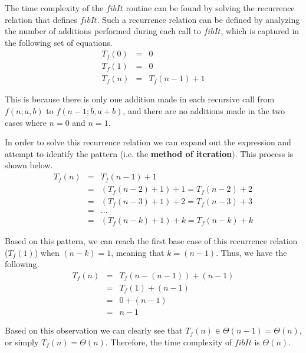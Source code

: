 \documentclass[11pt]{article}
\begin{document}
\begin{prob}{2}
\end{prob}
\begin{sol}

The time complexity of the $fibIt$ routine can be found by solving the recurrence relation that defines $fibIt$. Such a recurrence relation can be defined by analyzing the number of additions performed during each call to $fibIt$, which is captured in the following set of equations.
\begin{eqnarray*}
T_{f}(0) & = & 0 \\
T_{f}(1) & = & 0 \\
T_{f}(n) & = & T_{f}(n-1) + 1
\end{eqnarray*}

This is because there is only one addition made in each recursive call from $f(n;a,b)$ to $f(n-1;b,a+b)$, and there are no additions made in the two cases where $n = 0$ and $n = 1$.

In order to solve this recurrence relation we can expand out the expression and attempt to identify the pattern (i.e. the \textbf{method of iteration}). This process is shown below.
\begin{eqnarray*}
T_{f}(n) & = & T_{f}(n - 1) + 1 \\
& = & (T_{f}(n - 2) + 1) + 1 = T_{f}(n - 2) + 2 \\
& = & (T_{f}(n - 3) + 1) + 2 = T_{f}(n - 3) + 3 \\
& = & ... \\
& = & (T_{f}(n - k) + 1) + k = T_{f}(n - k) + k
\end{eqnarray*}

Based on this pattern, we can reach the first base case of this recurrence relation ($T_{f}(1)$) when $(n - k) = 1$, meaning that $k = (n - 1)$. Thus, we have the following.
\begin{eqnarray*}
T_{f}(n) & = & T_{f}(n - (n - 1)) + (n - 1)  \\
& = & T_{f}(1) + (n - 1) \\
& = & 0 + (n - 1) \\
& = & n - 1
\end{eqnarray*}

Based on this observation we can clearly see that $T_{f}(n) \in \Theta(n - 1) = \Theta(n)$, or simply $T_{f}(n) = \Theta(n)$. Therefore, the time complexity of $fibIt$ is $\Theta(n)$.




\end{sol}
\end{document}
